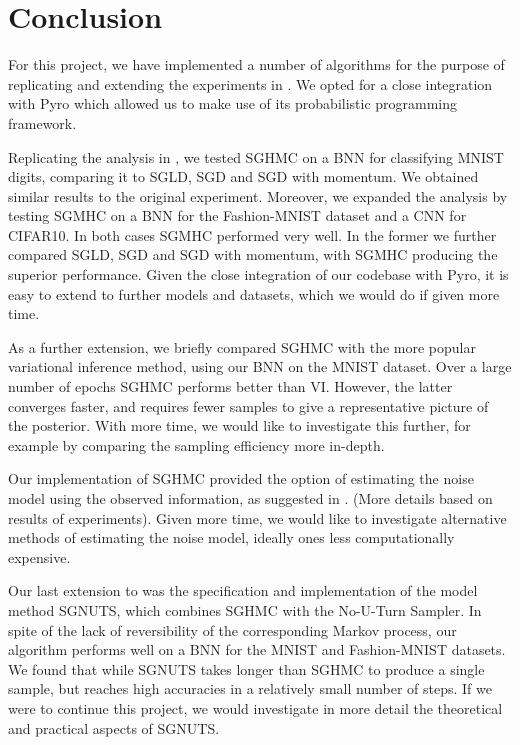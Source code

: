 
\section{Conclusion}

For this project, we have implemented a number of algorithms for the purpose of replicating and extending the experiments in \cite{sghmc}. We opted for a close integration with Pyro which allowed us to make use of its probabilistic programming framework. 

Replicating the analysis in \cite{sghmc}, we tested SGHMC on a BNN for classifying MNIST digits, comparing it to SGLD, SGD and SGD with momentum. We obtained similar results to the original experiment. Moreover, we expanded the analysis by testing SGMHC on a BNN for the Fashion-MNIST dataset and a CNN for CIFAR10. In both cases SGMHC performed very well. In the former we further compared SGLD, SGD and SGD with momentum, with SGMHC producing the superior performance. Given the close integration of our codebase with Pyro, it is easy to extend to further models and datasets, which we would do if given more time.

As a further extension, we briefly compared SGHMC with the more popular variational inference method, using our BNN on the MNIST dataset. Over a large number of epochs SGHMC performs better than VI. However, the latter converges faster, and requires fewer samples to give a representative picture of the posterior. With more time, we would like to investigate this further, for example by comparing the sampling efficiency more in-depth.

Our implementation of SGHMC provided the option of estimating the noise model using the observed information, as suggested in \cite{sghmc}. (More details based on results of experiments). Given more time, we would like to investigate alternative methods of estimating the noise model, ideally ones less computationally expensive.

Our last extension to \cite{sghmc} was the specification and implementation of the model method SGNUTS, which combines SGHMC with the No-U-Turn Sampler. In spite of the lack of reversibility of the corresponding Markov process, our algorithm performs well on a BNN for the MNIST and Fashion-MNIST datasets. We found that while SGNUTS takes longer than SGHMC to produce a single sample, but reaches high accuracies in a relatively small number of steps. If we were to continue this project, we would investigate in more detail the theoretical and practical aspects of SGNUTS.